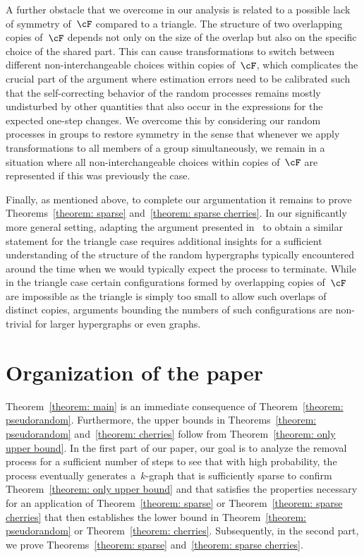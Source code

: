 \documentclass[11pt]{amsart}
\theoremstyle{definition}
\numberwithin{equation}{section}
\begin{document}
	A further obstacle that we overcome in our analysis is related to a possible lack of symmetry of~$\cF$ compared to a triangle.
	The structure of two overlapping copies of~$\cF$ depends not only on the size of the overlap but also on the specific choice of the shared part.
	This can cause transformations to switch between different non-interchangeable choices within copies of~$\cF$, which complicates the crucial part of the argument where estimation errors need to be calibrated such that the self-correcting behavior of the random processes remains mostly undisturbed by other quantities that also occur in the expressions for the expected one-step changes.
	We overcome this by considering our random processes in groups to restore symmetry in the sense that whenever we apply transformations to all members of a group simultaneously, we remain in a situation where all non-interchangeable choices within copies of~$\cF$ are represented if this was previously the case.
	
	Finally, as mentioned above, to complete our argumentation it remains to prove Theorems~\ref{theorem: sparse} and~\ref{theorem: sparse cherries}.
	In our significantly more general setting, adapting the argument presented in~\cite{BFL:15} to obtain a similar statement for the triangle case requires additional insights for a sufficient understanding of the structure of the random hypergraphs typically encountered around the time when we would typically expect the process to terminate.
	While in the triangle case certain configurations formed by overlapping copies of~$\cF$ are impossible as the triangle is simply too small to allow such overlaps of distinct copies, arguments bounding the numbers of such configurations are non-trivial for larger hypergraphs or even graphs.
	
	
	
	

\section{Organization of the paper}
	Theorem~\ref{theorem: main} is an immediate consequence of Theorem~\ref{theorem: pseudorandom}.
	Furthermore, the upper bounds in Theorems~\ref{theorem: pseudorandom} and~\ref{theorem: cherries} follow from Theorem~\ref{theorem: only upper bound}.
	In the first part of our paper, our goal is to analyze the removal process for a sufficient number of steps to see that with high probability, the process eventually generates a~$k$-graph that is sufficiently sparse to confirm Theorem~\ref{theorem: only upper bound} and that satisfies the properties necessary for an application of Theorem~\ref{theorem: sparse} or Theorem~\ref{theorem: sparse cherries} that then establishes the lower bound in Theorem~\ref{theorem: pseudorandom} or Theorem~\ref{theorem: cherries}.
	Subsequently, in the second part, we prove Theorems~\ref{theorem: sparse} and~\ref{theorem: sparse cherries}.
	
\end{document}
